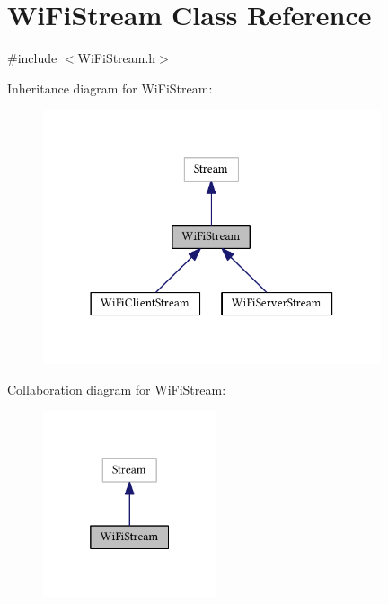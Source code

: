 \hypertarget{class_wi_fi_stream}{}\section{Wi\+Fi\+Stream Class Reference}
\label{class_wi_fi_stream}


{\ttfamily \#include $<$Wi\+Fi\+Stream.\+h$>$}



Inheritance diagram for Wi\+Fi\+Stream\+:\nopagebreak
\begin{figure}[H]
\begin{center}
\leavevmode
\includegraphics[width=282pt]{class_wi_fi_stream__inherit__graph}
\end{center}
\end{figure}


Collaboration diagram for Wi\+Fi\+Stream\+:\nopagebreak
\begin{figure}[H]
\begin{center}
\leavevmode
\includegraphics[width=145pt]{class_wi_fi_stream__coll__graph}
\end{center}
\end{figure}
